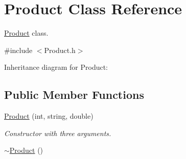 \hypertarget{classProduct}{}\section{Product Class Reference}
\label{classProduct}


\hyperlink{classProduct}{Product} class.  




{\ttfamily \#include $<$Product.\+h$>$}



Inheritance diagram for Product\+:
\subsection*{Public Member Functions}
\begin{DoxyCompactItemize}
\item 
\hyperlink{classProduct_aa7705364efa0a211575a00b5a6b8537c}{Product} (int, string, double)
\begin{DoxyCompactList}\small\item\em Constructor with three arguments. \end{DoxyCompactList}\item 
\hyperlink{classProduct_abe0afd3bea96d979185ec2cfdf681e6f}{$\sim$\+Product} ()\hypertarget{classProduct_abe0afd3bea96d979185ec2cfdf681e6f}{}\label{classProduct_abe0afd3bea96d979185ec2cfdf681e6f}


\end{DoxyCompactItemize}

